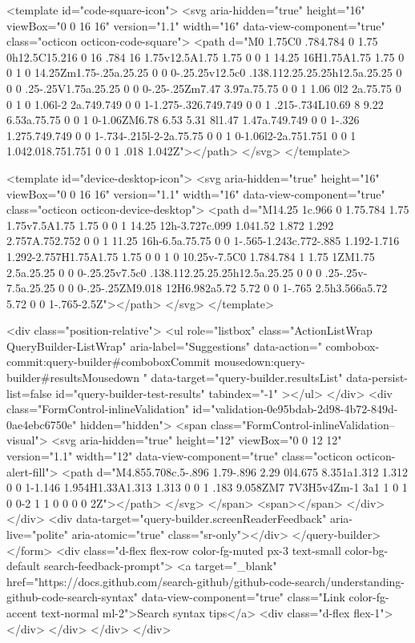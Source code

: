 <template id="code-square-icon">
  <svg aria-hidden="true" height="16" viewBox="0 0 16 16" version="1.1" width="16" data-view-component="true" class="octicon octicon-code-square">
    <path d="M0 1.75C0 .784.784 0 1.75 0h12.5C15.216 0 16 .784 16 1.75v12.5A1.75 1.75 0 0 1 14.25 16H1.75A1.75 1.75 0 0 1 0 14.25Zm1.75-.25a.25.25 0 0 0-.25.25v12.5c0 .138.112.25.25.25h12.5a.25.25 0 0 0 .25-.25V1.75a.25.25 0 0 0-.25-.25Zm7.47 3.97a.75.75 0 0 1 1.06 0l2 2a.75.75 0 0 1 0 1.06l-2 2a.749.749 0 0 1-1.275-.326.749.749 0 0 1 .215-.734L10.69 8 9.22 6.53a.75.75 0 0 1 0-1.06ZM6.78 6.53 5.31 8l1.47 1.47a.749.749 0 0 1-.326 1.275.749.749 0 0 1-.734-.215l-2-2a.75.75 0 0 1 0-1.06l2-2a.751.751 0 0 1 1.042.018.751.751 0 0 1 .018 1.042Z"></path>
</svg>
</template>

<template id="device-desktop-icon">
  <svg aria-hidden="true" height="16" viewBox="0 0 16 16" version="1.1" width="16" data-view-component="true" class="octicon octicon-device-desktop">
    <path d="M14.25 1c.966 0 1.75.784 1.75 1.75v7.5A1.75 1.75 0 0 1 14.25 12h-3.727c.099 1.041.52 1.872 1.292 2.757A.752.752 0 0 1 11.25 16h-6.5a.75.75 0 0 1-.565-1.243c.772-.885 1.192-1.716 1.292-2.757H1.75A1.75 1.75 0 0 1 0 10.25v-7.5C0 1.784.784 1 1.75 1ZM1.75 2.5a.25.25 0 0 0-.25.25v7.5c0 .138.112.25.25.25h12.5a.25.25 0 0 0 .25-.25v-7.5a.25.25 0 0 0-.25-.25ZM9.018 12H6.982a5.72 5.72 0 0 1-.765 2.5h3.566a5.72 5.72 0 0 1-.765-2.5Z"></path>
</svg>
</template>

        <div class="position-relative">
                <ul
                  role="listbox"
                  class="ActionListWrap QueryBuilder-ListWrap"
                  aria-label="Suggestions"
                  data-action="
                    combobox-commit:query-builder#comboboxCommit
                    mousedown:query-builder#resultsMousedown
                  "
                  data-target="query-builder.resultsList"
                  data-persist-list=false
                  id="query-builder-test-results"
                  tabindex="-1"
                ></ul>
        </div>
      <div class="FormControl-inlineValidation" id="validation-0e95bdab-2d98-4b72-849d-0ae4ebc6750e" hidden="hidden">
        <span class="FormControl-inlineValidation--visual">
          <svg aria-hidden="true" height="12" viewBox="0 0 12 12" version="1.1" width="12" data-view-component="true" class="octicon octicon-alert-fill">
    <path d="M4.855.708c.5-.896 1.79-.896 2.29 0l4.675 8.351a1.312 1.312 0 0 1-1.146 1.954H1.33A1.313 1.313 0 0 1 .183 9.058ZM7 7V3H5v4Zm-1 3a1 1 0 1 0 0-2 1 1 0 0 0 0 2Z"></path>
</svg>
        </span>
        <span></span>
</div>    </div>
    <div data-target="query-builder.screenReaderFeedback" aria-live="polite" aria-atomic="true" class="sr-only"></div>
</query-builder></form>
          <div class="d-flex flex-row color-fg-muted px-3 text-small color-bg-default search-feedback-prompt">
            <a target="_blank" href="https://docs.github.com/search-github/github-code-search/understanding-github-code-search-syntax" data-view-component="true" class="Link color-fg-accent text-normal ml-2">Search syntax tips</a>            <div class="d-flex flex-1"></div>
          </div>
        </div>
</div>

